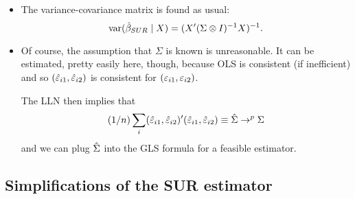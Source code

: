 \begin{itemize}[leftmargin=0pt]
\item The variance-covariance matrix is found as usual:
  \begin{equation*}
    \operatorname{var}(\hat{\beta}_{SUR} \mid X) = (X'(\Sigma \otimes I)^{-1}X)^{-1}.
  \end{equation*}

\item Of course, the assumption that $\Sigma$ is known is
  unreasonable. It can be estimated, pretty easily here, though,
  because OLS is consistent (if inefficient) and so $(\hat{\varepsilon}_{i1},
  \hat{\varepsilon}_{i2})$ is consistent for $(\varepsilon_{i1}, \varepsilon_{i2})$.

  The LLN then implies that
  \begin{equation*}
    (1/n) \sum_i (\hat{\varepsilon}_{i1}, \hat{\varepsilon}_{i2})' (\hat{\varepsilon}_{i1}, \hat{\varepsilon}_{i2})
    \equiv \hat{\Sigma} \to^p \Sigma
  \end{equation*}
  and we can plug $\hat{\Sigma}$ into the GLS formula for a feasible
  estimator.

\end{itemize}

\subsection{Simplifications of the SUR estimator}

